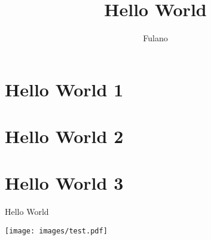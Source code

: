 \documentclass[A4paper, 12pt]{article}
\title{Hello World}
\author{Fulano}
\begin{document}
\maketitle
\tableofcontents


\section{Hello World 1} %


\section{Hello World 2} %


\section{Hello World 3} %



Hello World

\texttt{[image: images/test.pdf]}
\end{document}
